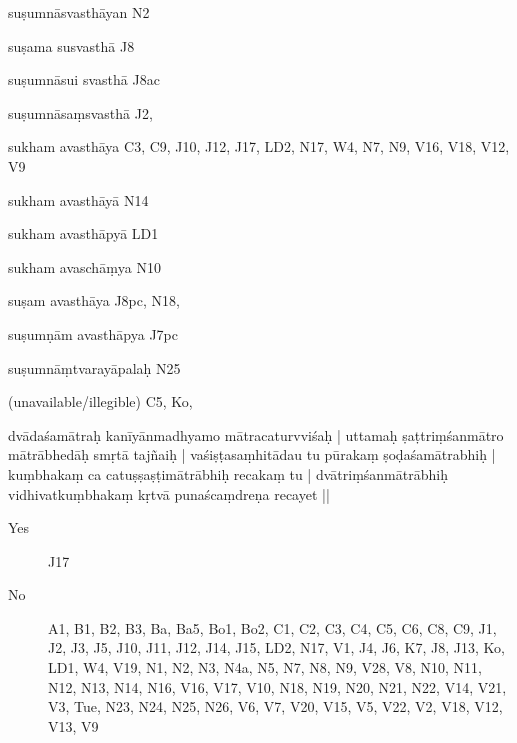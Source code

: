\begin{ekdosis}
\begin{marma}[hp01_055]
\begin{marma}[hp02_006]
    \item[suṣumnāsvasthāyan] N2
    \item[suṣama susvasthā] J8
    \item[suṣumnāsui svasthā] J8ac %
    \item[suṣumnāsaṃsvasthā] J2,
    \item[sukham avasthāya] C3, C9, J10, J12, J17, LD2, N17, W4, N7, N9, V16, V18, V12, V9
    \item[sukham avasthāyā] N14
    \item[sukham avasthāpyā] LD1
    \item[sukham avaschāṃya] N10
    \item[suṣam avasthāya] J8pc, N18,
    \item[suṣumṇām avasthāpya] J7pc
    \item[suṣumnāṃtvarayāpalaḥ] N25
    \item[(unavailable/illegible)] C5, Ko, 

      \begin{description}

      \end{description}
    \end{marma}


    \begin{marma}[hp02_009]
      dvādaśamātraḥ kanīyānmadhyamo mātracaturvviśaḥ |
      uttamaḥ ṣaṭtriṃśanmātro mātrābhedāḥ smṛtā tajñaiḥ |
      vaśiṣṭasaṃhitādau tu pūrakaṃ ṣoḍaśamātrabhiḥ |
      kuṃbhakaṃ ca catuṣṣaṣṭimātrābhiḥ recakaṃ tu |
      dvātriṃśanmātrābhiḥ vidhivatkuṃbhakaṃ kṛtvā punaścaṃdreṇa recayet ||
      \begin{description}
      \item[Yes] J17
      \item[No] A1, B1, B2, B3, Ba, Ba5, Bo1, Bo2, C1, C2, C3, C4, C5, C6, C8, C9, J1, J2, J3, J5, J10, J11, J12, J14, J15, LD2, N17, V1, J4, J6, K7, J8, J13, Ko, LD1, W4, V19, N1, N2, N3, N4a, N5, N7, N8, N9, V28, V8, N10, N11, N12, N13, N14, N16, V16, V17, V10, N18, N19, N20, N21, N22, V14, V21, V3, Tue, N23, N24, N25, N26, V6, V7, V20, V15, V5, V22, V2, V18, V12, V13, V9
      \end{description}


\end{marma}
\end{marma}
\end{ekdosis}
